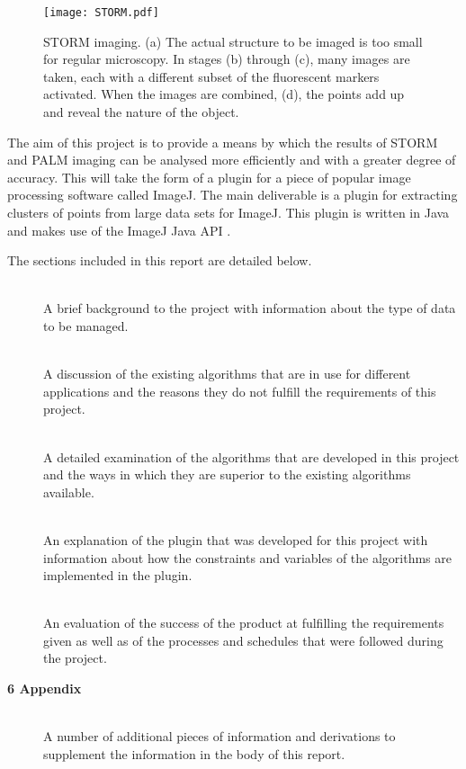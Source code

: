 \begin{figure}[tbh]
	\centering
	\texttt{[image: STORM.pdf]}

	\caption[Creation of a STORM image.]{STORM imaging. (a) The actual
		structure to be imaged is too small for regular microscopy. In stages
		(b) through (c), many images are taken, each with a different subset of
		the fluorescent markers activated. When the images are combined, (d),
		the points add up and reveal the nature of the object.}\label{fig:STORM}
\end{figure}

The aim of this project is to provide a means by which the results of STORM and
PALM imaging can be analysed more efficiently and with a greater degree of
accuracy. This will take the form of a plugin for a piece of popular image
processing software called ImageJ. The main deliverable is a plugin for
extracting clusters of points from large data sets for ImageJ. This plugin is
written in Java and makes use of the ImageJ Java API \cite{imagejapi}.

The sections included in this report are detailed below.

\begin{description}
	\item[] \hfill \\
		A brief background to the project with information about the type of
		data to be managed.

	\item[] \hfill \\
		A discussion of the existing algorithms that are in use for different
		applications and the reasons they do not fulfill the requirements of
		this project.

	\item[] \hfill \\
		A detailed examination of the algorithms that are developed in this
		project and the ways in which they are superior to the existing
		algorithms available.

	\item[] \hfill \\
		An explanation of the plugin that was developed for this project with
		information about how the constraints and variables of the algorithms
		are implemented in the plugin.

	\item[] \hfill \\
		An evaluation of the success of the product at fulfilling the
		requirements given as well as of the processes and schedules that were
		followed during the project.

	\item[\textbf{6 Appendix}] \hfill \\
		A number of additional pieces of information and derivations to
		supplement the information in the body of this report.
\end{description}
